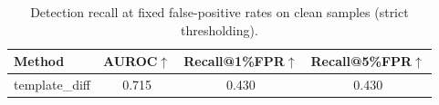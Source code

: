 \begin{table}[t]
\centering
\small
\begin{tabular}{lccc}
\toprule
Method & AUROC$\uparrow$ & Recall@1\%FPR$\uparrow$ & Recall@5\%FPR$\uparrow$ \\
\midrule
template\_diff & 0.715 & 0.430 & 0.430 \\
\bottomrule
\end{tabular}
\caption{Detection recall at fixed false-positive rates on clean samples (strict thresholding).}
\label{tab:detection_fpr_single}
\end{table}
